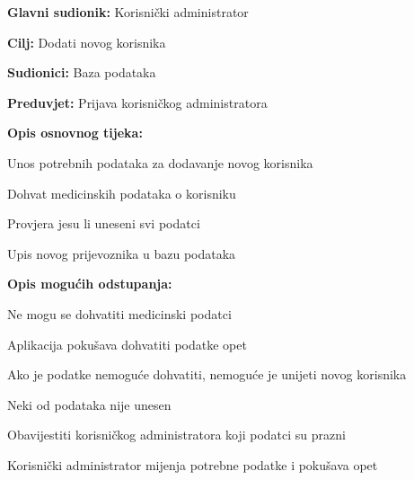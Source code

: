			\noindent {}
			\begin{packed_item}
				
				\item \textbf{Glavni sudionik: }Korisnički administrator
				\item  \textbf{Cilj:} Dodati novog korisnika
				\item  \textbf{Sudionici:} Baza podataka
				\item  \textbf{Preduvjet:} Prijava korisničkog administratora
				\item  \textbf{Opis osnovnog tijeka:}
				
				\item[] \begin{packed_enum}
					
					\item Unos potrebnih podataka za dodavanje novog korisnika
					\item Dohvat medicinskih podataka o korisniku
					\item Provjera jesu li uneseni svi podatci
					\item Upis novog prijevoznika u bazu podataka
				\end{packed_enum}
				
				\item  \textbf{Opis mogućih odstupanja:}
				
				\item[] \begin{packed_item}
					
					\item[2.b] Ne mogu se dohvatiti medicinski podatci
					\item[] \begin{packed_enum}
						
						\item Aplikacija pokušava dohvatiti podatke opet
						\item Ako je podatke nemoguće dohvatiti, nemoguće je unijeti novog korisnika
						
					\end{packed_enum}
					
					\item[3.a] Neki od podataka nije unesen
					\item[] \begin{packed_enum}
						
						\item Obavijestiti korisničkog administratora koji podatci su prazni
						\item Korisnički administrator mijenja potrebne podatke i pokušava opet
						
					\end{packed_enum}
					
				\end{packed_item}
			\end{packed_item}
					
